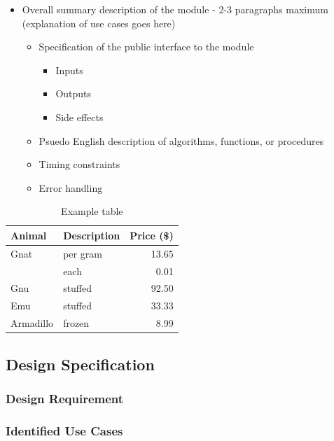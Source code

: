 \documentclass[12pt]{article} %
\begin{document}
\begin{itemize}
	\item Overall summary description of the module - 2-3 paragraphs maximum
		(explanation of use cases goes here)

		\begin{itemize}
			\item Specification of the public interface to the module

				\begin{itemize}
					\item Inputs
					\item Outputs
					\item Side effects
				\end{itemize}

			\item Psuedo English description of algorithms, functions, or procedures
			\item Timing constraints
			\item Error handling
		\end{itemize}
\end{itemize}

\begin{table}[h]
	\centering
	\begin{tabular}{llr}
		\toprule
		Animal    & Description & Price (\$) \\
		\midrule
		Gnat      & per gram    & 13.65      \\
		& each        & 0.01       \\
		Gnu       & stuffed     & 92.50      \\
		Emu       & stuffed     & 33.33      \\
		Armadillo & frozen      & 8.99       \\
		\bottomrule
	\end{tabular}
	\caption{Example table}
	\label{table:ex}
\end{table}

\subsection{Design Specification\label{sec:designSpec}}

\subsubsection{Design Requirement\label{sec:requirements}}

\subsubsection{Identified Use Cases\label{sec:identifiedUseCases}}
\end{document}
